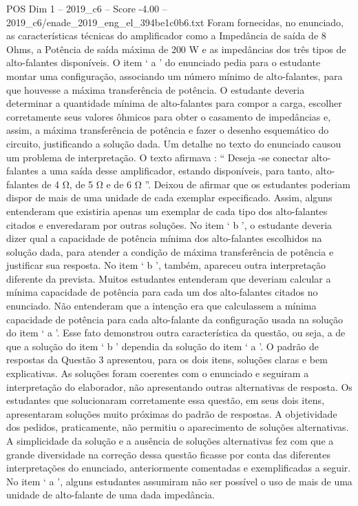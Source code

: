 \begin{textsample}{POS Dim 1 – 2019\_c6 – Score -4.00 – 2019\_c6/enade\_2019\_eng\_el\_394be1c0b6.txt}
Foram fornecidas, no enunciado, as características técnicas do amplificador como a Impedância de saída de 8 Ohms, a Potência de saída máxima de 200 W e as impedâncias dos três tipos de alto-falantes disponíveis.
O item ‘ a ’ do enunciado pedia para o estudante montar uma configuração, associando um número mínimo de alto-falantes, para que houvesse a máxima transferência de potência.
O estudante deveria determinar a quantidade mínima de alto-falantes para compor a carga, escolher corretamente seus valores ôhmicos para obter o casamento de impedâncias e, assim, a máxima transferência de potência e fazer o desenho esquemático do circuito, justificando a solução dada.
Um detalhe no texto do enunciado causou um problema de interpretação.
O texto afirmava : “ Deseja -se conectar alto-falantes a uma saída desse amplificador, estando disponíveis, para tanto, alto-falantes de 4 Ω, de 5 Ω e de 6 Ω ”.
Deixou de afirmar que os estudantes poderiam dispor de mais de uma unidade de cada exemplar especificado.
Assim, alguns entenderam que existiria apenas um exemplar de cada tipo dos alto-falantes citados e enveredaram por outras soluções.
No item ‘ b ’, o estudante deveria dizer qual a capacidade de potência mínima dos alto-falantes escolhidos na solução dada, para atender a condição de máxima transferência de potência e justificar sua resposta.
No item ‘ b ’, também, apareceu outra interpretação diferente da prevista.
Muitos estudantes entenderam que deveriam calcular a mínima capacidade de potência para cada um dos alto-falantes citados no enunciado.
Não entenderam que a intenção era que calculassem a mínima capacidade de potência para cada alto-falante da configuração usada na solução do item ‘ a ’.
Esse fato demonstrou outra característica da questão, ou seja, a de que a solução do item ‘ b ’ dependia da solução do item ‘ a ’.
O padrão de respostas da Questão 3 apresentou, para os dois itens, soluções claras e bem explicativas.
As soluções foram coerentes com o enunciado e seguiram a interpretação do elaborador, não apresentando outras alternativas de resposta.
Os estudantes que solucionaram corretamente essa questão, em seus dois itens, apresentaram soluções muito próximas do padrão de respostas.
A objetividade dos pedidos, praticamente, não permitiu o aparecimento de soluções alternativas.
A simplicidade da solução e a ausência de soluções alternativas fez com que a grande diversidade na correção dessa questão ficasse por conta das diferentes interpretações do enunciado, anteriormente comentadas e exemplificadas a seguir.
No item ‘ a ’, alguns estudantes assumiram não ser possível o uso de mais de uma unidade de alto-falante de uma dada impedância.

\end{textsample}
